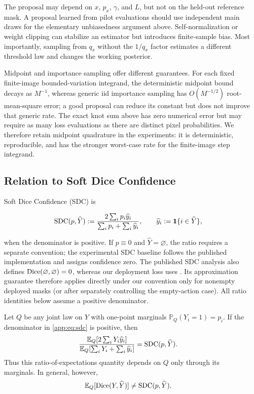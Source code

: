 The proposal may depend on \(x\), \(p_x\), \(\gamma\), and \(L\), but not on
the held-out reference mask. A proposal learned from pilot evaluations should
use independent main draws for the elementary unbiasedness argument above.
Self-normalization or weight clipping can stabilize an estimator but introduces
finite-sample bias. Most importantly, sampling from \(q_x\) without the
\(1/q_x\) factor estimates a different threshold law and changes the working
posterior.

Midpoint and importance sampling offer different guarantees. For each fixed
finite-image bounded-variation integrand, the deterministic midpoint bound
decays as \(M^{-1}\), whereas generic iid importance sampling has
\(O(M^{-1/2})\) root-mean-square error; a good proposal can reduce its constant
but does not improve that generic rate.
The exact knot sum above has zero numerical error but may require as many loss
evaluations as there are distinct pixel probabilities. We therefore retain
midpoint quadrature in the experiments: it is deterministic, reproducible, and
has the stronger worst-case rate for the finite-image step integrand.

\subsection{Relation to Soft Dice Confidence}

Soft Dice Confidence (SDC) \cite{sdc} is

\begin{equation}
  \operatorname{SDC}(p,\widehat Y)
  :=\frac{2\sum_i p_i\widehat y_i}
          {\sum_i p_i+\sum_i\widehat y_i},
  \qquad
  \widehat y_i:=\mathbf{1}\{i\in\widehat Y\},
  \label{app:eq:sdc}
\end{equation}

when the denominator is positive. If $p\equiv0$ and
$\widehat Y=\varnothing$, the ratio requires a separate convention; the
experimental SDC baseline follows the published implementation and assigns
confidence zero. The published SDC analysis also defines
$\operatorname{Dice}(\varnothing,\varnothing)=0$, whereas our deployment loss uses
. Its approximation guarantee therefore
applies directly under our convention only for nonempty deployed masks (or
after separately controlling the empty-action case). All ratio identities
below assume a positive denominator.

\begin{proposition}
\label{app:prop:sdc-ratio}
Let $Q$ be any joint law on $Y$ with one-point marginals
$\mathbb{P}_Q(Y_i=1)=p_i$.  If the denominator in
\cref{app:eq:sdc} is positive, then
\begin{equation}
  \frac{
    \mathbb{E}_Q[2\sum_iY_i\widehat y_i]
  }{
    \mathbb{E}_Q[\sum_iY_i+\sum_i\widehat y_i]
  }
  =\operatorname{SDC}(p,\widehat Y).
  \label{app:eq:sdc-ratio-identity}
\end{equation}
Thus this ratio-of-expectations quantity depends on $Q$ only through its
marginals.  In general, however,
\begin{equation*}
  \mathbb{E}_Q[\operatorname{Dice}(Y,\widehat Y)]
  \neq \operatorname{SDC}(p,\widehat Y).
\end{equation*}
\end{proposition}

